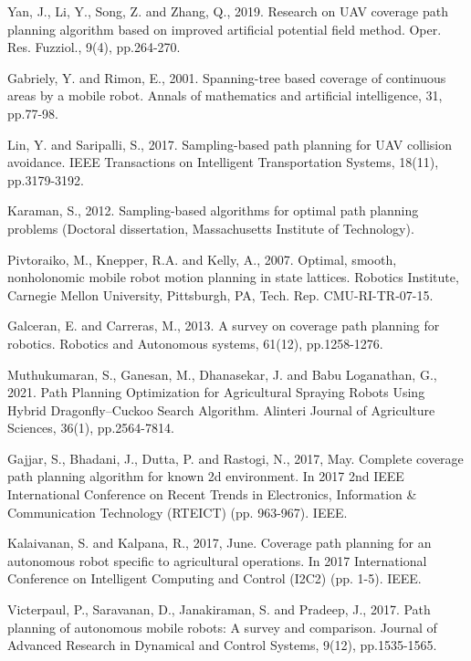 \begin{thebibliography}{9}
Yan, J., Li, Y., Song, Z. and Zhang, Q., 2019. Research on UAV coverage path planning algorithm based on improved artificial potential field method. Oper. Res. Fuzziol., 9(4), pp.264-270.

Gabriely, Y. and Rimon, E., 2001. Spanning-tree based coverage of continuous areas by a mobile robot. Annals of mathematics and artificial intelligence, 31, pp.77-98.

Lin, Y. and Saripalli, S., 2017. Sampling-based path planning for UAV collision avoidance. IEEE Transactions on Intelligent Transportation Systems, 18(11), pp.3179-3192.

Karaman, S., 2012. Sampling-based algorithms for optimal path planning problems (Doctoral dissertation, Massachusetts Institute of Technology).

Pivtoraiko, M., Knepper, R.A. and Kelly, A., 2007. Optimal, smooth, nonholonomic mobile robot motion planning in state lattices. Robotics Institute, Carnegie Mellon University, Pittsburgh, PA, Tech. Rep. CMU-RI-TR-07-15.

\bibitem{}
Galceran, E. and Carreras, M., 2013. A survey on coverage path planning for robotics. Robotics and Autonomous systems, 61(12), pp.1258-1276.

\bibitem{}
Muthukumaran, S., Ganesan, M., Dhanasekar, J. and Babu Loganathan, G., 2021. Path Planning Optimization for Agricultural Spraying Robots Using Hybrid Dragonfly–Cuckoo Search Algorithm. Alinteri Journal of Agriculture Sciences, 36(1), pp.2564-7814.

\bibitem{}
Gajjar, S., Bhadani, J., Dutta, P. and Rastogi, N., 2017, May. Complete coverage path planning algorithm for known 2d environment. In 2017 2nd IEEE International Conference on Recent Trends in Electronics, Information \& Communication Technology (RTEICT) (pp. 963-967). IEEE.

\bibitem{}
Kalaivanan, S. and Kalpana, R., 2017, June. Coverage path planning for an autonomous robot specific to agricultural operations. In 2017 International Conference on Intelligent Computing and Control (I2C2) (pp. 1-5). IEEE.

\bibitem{}
Victerpaul, P., Saravanan, D., Janakiraman, S. and Pradeep, J., 2017. Path planning of autonomous mobile robots: A survey and comparison. Journal of Advanced Research in Dynamical and Control Systems, 9(12), pp.1535-1565.


\end{thebibliography}
